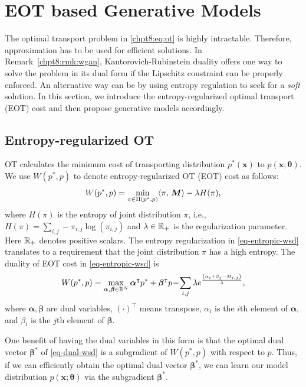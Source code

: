 \section{EOT based Generative Models}

The optimal transport problem in \eqref{chpt8:eq:ot} is highly intractable. Therefore, approximation has to be used for efficient solutions. In Remark~\ref{chpt8:rmk:wgan}, Kantorovich-Rubinstein duality offers one way to solve the problem in its dual form if the Lipschitz constraint can be properly enforced. An alternative way can be by using entropy regulation to seek for a \textit{soft} solution. In this section, we introduce the entropy-regularized optimal transport (EOT) cost and then propose generative models accordingly.

\subsection{Entropy-regularized OT} 

OT calculates the minimum cost of transporting distribution $p^{\ast}(\bm{x})$ to $p(\bm{x}; \bm{\theta})$. We use $W(p^{\ast},p)$ to denote entropy-regularized OT (EOT) cost as follows:
\begin{equation}\label{eq-entropic-wsd}
  W(p^{\ast},p)=\min_{ \pi \in \Pi(p^{\ast}, p)} \langle \pi,\,\bm{M}\rangle - \lambda H(\pi),
\end{equation}
where $H(\pi)$ is the entropy of joint distribution $\pi$, i.e., $H(\pi) = \sum_{i,j} -\pi_{i,j}
\log(\pi_{i,j})$ and $\lambda \in \mathbb{R}_{+}$ is the regularization
parameter. Here $\mathbb{R}_{+}$ denotes positive scalars. The entropy regularization in \eqref{eq-entropic-wsd}  translates 
to a requirement that the joint distribution $\pi$ has a high entropy. 
 The duality of EOT cost in \eqref{eq-entropic-wsd} is
\begin{equation}\label{eq-dual-wsd}
  W(p^{\ast}, p)  =  \max_{\bm{\al}, \bm{\be} \in \mathbb{R}^{N}} \bm{\al}^{\intercal}p^{\ast} + \bm{\beta}^{\intercal}p \! - \!
  \sum_{i,j} \lambda e^{ \frac{{\left( \al_i + \beta_j - M_{i,j} \right)}}{\la} },\vspace{-2pt}
\end{equation}
where $\bm{\alpha},\bm{\beta}$ are dual variables, $(\cdot)^{\intercal}$ means transpose, $\alpha_i$ is the $i$th element of $\bm{\alpha}$, and $\beta_i$ is the $j$th element of $\bm{\beta}$.

One benefit of having the dual variables in this form is that the optimal dual vector $\bm{\beta}^{\ast}$
of \eqref{eq-dual-wsd} is a subgradient of $W(p^{\ast},p)$ with respect to $p$. Thus, if we can efficiently obtain the optimal dual vector $\bm{\beta}^{\ast}$, we can learn our model distribution $p(\bm{x}; \bm{\theta})$ via the subgradient $\bm{\beta}^{\ast}$.


